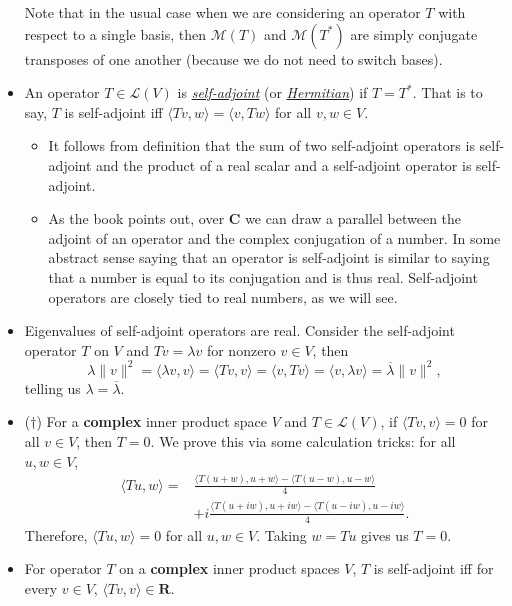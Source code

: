 \documentclass{article}
\newcommand{\df}[1]{\ul{\textit{#1}}}
\newcommand{\R}{\mathbf{R}}
\newcommand{\C}{\mathbf{C}}
\newcommand{\conj}[1]{\overline{#1}}
\newcommand{\inp}[2]{\langle #1, #2 \rangle}
\newcommand{\nm}[1]{\| #1 \|}
\newcommand{\LV}{\mathcal{L}(V)}
\newcommand{\M}{\mathcal{M}}
\begin{document}
\begin{itemize}
    Note that in the usual case when we are considering an operator $T$ with respect to a single basis, then $\M(T)$ and $\M(T^*)$ are simply conjugate transposes of one another (because we do not need to switch bases).
    \item An operator $T \in \LV$ is \df{self-adjoint} (or \df{Hermitian}) if $T=T^*$. That is to say, $T$ is self-adjoint iff $\inp{Tv}{w}=\inp{v}{Tw}$ for all $v,w \in V$.
    \begin{itemize}
        \item It follows from definition that the sum of two self-adjoint operators is self-adjoint and the product of a real scalar and a self-adjoint operator is self-adjoint.
        \item As the book points out, over $\C$ we can draw a parallel between the adjoint of an operator and the complex conjugation of a number. In some abstract sense saying that an operator is self-adjoint is similar to saying that a number is equal to its conjugation and is thus real. Self-adjoint operators are closely tied to real numbers, as we will see.
    \end{itemize}
    \item Eigenvalues of self-adjoint operators are real. Consider the self-adjoint operator $T$ on $V$ and $Tv = \lambda v$ for nonzero $v \in V$, then $$\lambda \nm{v}^2 = \inp{\lambda v}{v} = \inp{Tv}{v} = \inp{v}{Tv} = \inp{v}{\lambda v} = \conj{\lambda}\nm{v}^2,$$ telling us $\lambda = \conj{\lambda}$.
    \item ($\dagger$) For a \textbf{complex} inner product space $V$ and $T \in \LV$, if $\inp{Tv}{v}=0$ for all $v \in V$, then $T = 0$. We prove this via some calculation tricks: for all $u,w \in V$,
    \begin{align*}
        \inp{Tu}{w} = & \frac{\inp{T(u+w)}{u+w} - \inp{T(u-w)}{u-w}}{4} \\ & + i \frac{\inp{T(u+iw)}{u+iw} - \inp{T(u-iw)}{u-iw}}{4}.
    \end{align*}
    Therefore, $\inp{Tu}{w} = 0$ for all $u,w \in V$. Taking $w = Tu$ gives us $T = 0$.
    \item For operator $T$ on a \textbf{complex} inner product spaces $V$, $T$ is self-adjoint iff for every $v \in V$, $\inp{Tv}{v} \in \R$.
    

\end{itemize}
\end{document}

